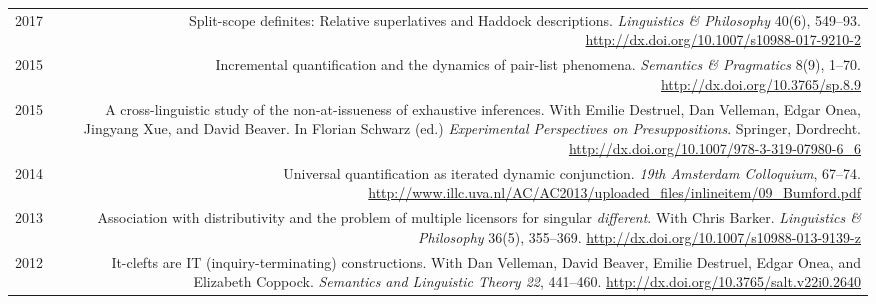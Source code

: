 \documentclass[12pt]{article}
\newcommand{\doi}[1]{\url{http://dx.doi.org/#1}}
\newcommand{\refmark}{\textcolor{gray}{\textdagger}}
\begin{document}
\begin{longtable}{LR}
  2017  & Split-scope definites: Relative superlatives and Haddock
          descriptions.\newline
          \textit{Linguistics \& Philosophy} 40(6), 549--93.\newline
          \doi{10.1007/s10988-017-9210-2}\\
  2015  & Incremental quantification and the dynamics of pair-list phenomena.\newline
          \textit{Semantics \& Pragmatics} 8(9), 1--70.\newline
          \doi{10.3765/sp.8.9}\\
  2015  & A cross-linguistic study of the non-at-issueness of exhaustive
          inferences.\newline
          With Emilie Destruel, Dan Velleman, Edgar Onea, Jingyang Xue, and
          David Beaver.\newline
          In Florian Schwarz (ed.) \textit{Experimental Perspectives on
          Presuppositions}. Springer, Dordrecht.\newline
          \doi{10.1007/978-3-319-07980-6_6}\\ %
  2014  & Universal quantification as iterated dynamic conjunction.\newline
          \textit{19th Amsterdam Colloquium}, 67--74.\newline
          \url{http://www.illc.uva.nl/AC/AC2013/uploaded_files/inlineitem/09_Bumford.pdf}\\
  2013  & Association with distributivity and the problem of multiple
          licensors for singular \textit{different}.\newline
          With Chris Barker.\newline
          \textit{Linguistics \& Philosophy} 36(5), 355--369.\newline
          \doi{10.1007/s10988-013-9139-z}\\ %
  2012  & It-clefts are IT (inquiry-terminating) constructions.\newline
          With Dan Velleman, David Beaver, Emilie Destruel, Edgar Onea, and
          Elizabeth Coppock.\newline
          \textit{Semantics and Linguistic Theory 22}, 441--460.\newline
          \doi{10.3765/salt.v22i0.2640}
\end{longtable}
\endgroup
\end{document}
